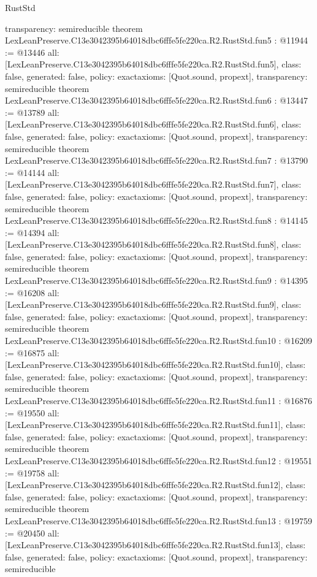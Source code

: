 \begin{lexlean}{RustStd}
\begin{coremodule}
{  transparency: semireducible
}
theorem LexLeanPreserve.C13e3042395b64018dbc6fffe5fe220ca.R2.RustStd.fun5 : @11944 := @13446 {
  all: [LexLeanPreserve.C13e3042395b64018dbc6fffe5fe220ca.R2.RustStd.fun5],
  class: false,
  generated: false,
  policy: exact{axioms: [Quot.sound, propext]},
  transparency: semireducible
}
theorem LexLeanPreserve.C13e3042395b64018dbc6fffe5fe220ca.R2.RustStd.fun6 : @13447 := @13789 {
  all: [LexLeanPreserve.C13e3042395b64018dbc6fffe5fe220ca.R2.RustStd.fun6],
  class: false,
  generated: false,
  policy: exact{axioms: [Quot.sound, propext]},
  transparency: semireducible
}
theorem LexLeanPreserve.C13e3042395b64018dbc6fffe5fe220ca.R2.RustStd.fun7 : @13790 := @14144 {
  all: [LexLeanPreserve.C13e3042395b64018dbc6fffe5fe220ca.R2.RustStd.fun7],
  class: false,
  generated: false,
  policy: exact{axioms: [Quot.sound, propext]},
  transparency: semireducible
}
theorem LexLeanPreserve.C13e3042395b64018dbc6fffe5fe220ca.R2.RustStd.fun8 : @14145 := @14394 {
  all: [LexLeanPreserve.C13e3042395b64018dbc6fffe5fe220ca.R2.RustStd.fun8],
  class: false,
  generated: false,
  policy: exact{axioms: [Quot.sound, propext]},
  transparency: semireducible
}
theorem LexLeanPreserve.C13e3042395b64018dbc6fffe5fe220ca.R2.RustStd.fun9 : @14395 := @16208 {
  all: [LexLeanPreserve.C13e3042395b64018dbc6fffe5fe220ca.R2.RustStd.fun9],
  class: false,
  generated: false,
  policy: exact{axioms: [Quot.sound, propext]},
  transparency: semireducible
}
theorem LexLeanPreserve.C13e3042395b64018dbc6fffe5fe220ca.R2.RustStd.fun10 : @16209 := @16875 {
  all: [LexLeanPreserve.C13e3042395b64018dbc6fffe5fe220ca.R2.RustStd.fun10],
  class: false,
  generated: false,
  policy: exact{axioms: [Quot.sound, propext]},
  transparency: semireducible
}
theorem LexLeanPreserve.C13e3042395b64018dbc6fffe5fe220ca.R2.RustStd.fun11 : @16876 := @19550 {
  all: [LexLeanPreserve.C13e3042395b64018dbc6fffe5fe220ca.R2.RustStd.fun11],
  class: false,
  generated: false,
  policy: exact{axioms: [Quot.sound, propext]},
  transparency: semireducible
}
theorem LexLeanPreserve.C13e3042395b64018dbc6fffe5fe220ca.R2.RustStd.fun12 : @19551 := @19758 {
  all: [LexLeanPreserve.C13e3042395b64018dbc6fffe5fe220ca.R2.RustStd.fun12],
  class: false,
  generated: false,
  policy: exact{axioms: [Quot.sound, propext]},
  transparency: semireducible
}
theorem LexLeanPreserve.C13e3042395b64018dbc6fffe5fe220ca.R2.RustStd.fun13 : @19759 := @20450 {
  all: [LexLeanPreserve.C13e3042395b64018dbc6fffe5fe220ca.R2.RustStd.fun13],
  class: false,
  generated: false,
  policy: exact{axioms: [Quot.sound, propext]},
  transparency: semireducible
}
\end{coremodule}
\end{lexlean}
